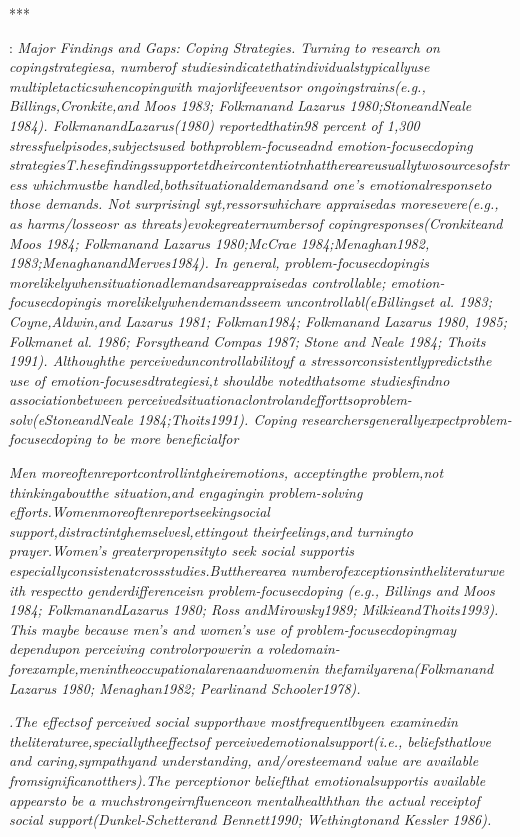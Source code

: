 \documentclass[]{article}
\begin{document}
***

\cite{thoits1995stress}:
\textit{Major Findings and Gaps: Coping Strategies. Turning to research on copingstrategiesa, numberof studiesindicatethatindividualstypicallyuse multipletacticswhencopingwith majorlifeeventsor ongoingstrains(e.g., Billings,Cronkite,and Moos 1983; Folkmanand Lazarus 1980;StoneandNeale 1984). FolkmanandLazarus(1980) reportedthatin98 percent of 1,300 stressfuelpisodes,subjectsused bothproblem-focuseadnd emotion-focusecdoping strategiesT.hesefindingssupportetdheircontentiotnhatthereareusuallytwosourcesofstress whichmustbe handled,bothsituationaldemandsand one's emotionalresponseto those demands. Not surprisingl syt,ressorswhichare appraisedas moresevere(e.g., as harms/losseosr as threats)evokegreaternumbersof copingresponses(Cronkiteand Moos 1984; Folkmanand Lazarus 1980;McCrae 1984;Menaghan1982, 1983;MenaghanandMerves1984). In general, problem-focusecdopingis morelikelywhensituationadlemandsareappraisedas controllable; emotion-focusecdopingis morelikelywhendemandsseem uncontrollabl(eBillingset al. 1983; Coyne,Aldwin,and Lazarus 1981; Folkman1984; Folkmanand Lazarus 1980, 1985; Folkmanet al. 1986; Forsytheand Compas 1987; Stone and Neale 1984; Thoits 1991). Althoughthe perceiveduncontrollabilitoyf a stressorconsistentlypredictsthe use of emotion-focusesdtrategiesi,t shouldbe notedthatsome studiesfindno associationbetween perceivedsituationaclontrolandefforttsoproblem-solv(eStoneandNeale 1984;Thoits1991). Coping researchersgenerallyexpectproblem-focusecdoping to be more beneficialfor}

\textit{Men moreoftenreportcontrollintgheiremotions, acceptingthe problem,not thinkingaboutthe situation,and engagingin problem-solving efforts.Womenmoreoftenreportseekingsocial support,distractintghemselvesl,ettingout theirfeelings,and turningto prayer.Women's greaterpropensityto seek social supportis especiallyconsistenatcrossstudies.Buttherearea numberofexceptionsintheliteraturwe ith respectto genderdifferenceisn problem-focusecdoping (e.g., Billings and Moos 1984; FolkmanandLazarus 1980; Ross andMirowsky1989; MilkieandThoits1993). This maybe because men's and women's use of problem-focusecdopingmay dependupon perceiving controlorpowerin a roledomain-forexample,menintheoccupationalarenaandwomenin thefamilyarena(Folkmanand Lazarus 1980; Menaghan1982; Pearlinand Schooler1978).}

\textit{.The effectsof perceived social supporthave mostfrequentlbyeen examinedin theliteraturee,speciallytheeffectsof perceivedemotionalsupport(i.e., beliefsthatlove and caring,sympathyand understanding, and/oresteemand value are available fromsignificanotthers).The perceptionor beliefthat emotionalsupportis available appearsto be a muchstrongeirnfluenceon mentalhealththan the actual receiptof social support(Dunkel-Schetterand Bennett1990; Wethingtonand Kessler 1986).}
\end{document}
